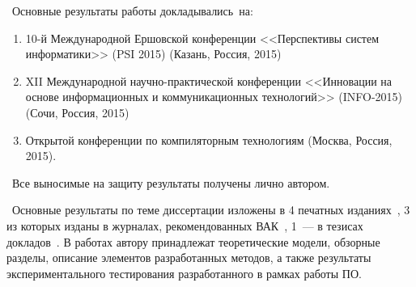 \probation\
Основные результаты работы докладывались~на:
\begin{enumerate}
 \item 10-й Международной Ершовской конференции <<Перспективы систем информатики>> (PSI 2015) (Казань, Россия, 2015)
 \item XII Международной научно-практической конференции <<Инновации на основе информационных и коммуникационных технологий>> (INFO-2015) (Сочи, Россия, 2015)
 \item Открытой конференции по компиляторным технологиям (Москва, Россия, 2015).
\end{enumerate}


\contribution\ Все выносимые на защиту результаты получены лично автором.

\publications\ Основные результаты по теме диссертации изложены в 4 печатных изданиях~\cite{summary-impl-mine,summary-intro-mine,summary-inter-unit-mine,info-2015},
3 из которых изданы в журналах, рекомендованных ВАК~\cite{summary-impl-mine,summary-intro-mine,summary-inter-unit-mine}, 
1~--- в тезисах докладов~\cite{info-2015}. В работах \cite{summary-impl-mine,summary-intro-mine,summary-inter-unit-mine} автору принадлежат теоретические модели, обзорные разделы, описание элементов разработанных методов, а также результаты экспериментального тестирования разработанного в рамках работы ПО.
